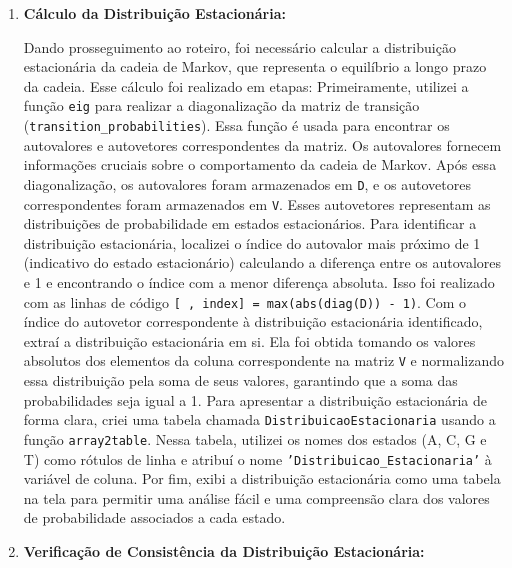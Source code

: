 \documentclass{article}
\begin{document}
\begin{enumerate}
    \item \textbf{Cálculo da Distribuição Estacionária:}
    
    Dando prosseguimento ao roteiro, foi necessário calcular a distribuição estacionária da cadeia de Markov, que representa o equilíbrio a longo prazo da cadeia. Esse cálculo foi realizado em etapas: Primeiramente, utilizei a função \texttt{eig} para realizar a diagonalização da matriz de transição (\texttt{transition\_probabilities}). Essa função é usada para encontrar os autovalores e autovetores correspondentes da matriz. Os autovalores fornecem informações cruciais sobre o comportamento da cadeia de Markov. Após essa diagonalização, os autovalores foram armazenados em \texttt{D}, e os autovetores correspondentes foram armazenados em \texttt{V}. Esses autovetores representam as distribuições de probabilidade em estados estacionários. Para identificar a distribuição estacionária, localizei o índice do autovalor mais próximo de 1 (indicativo do estado estacionário) calculando a diferença entre os autovalores e 1 e encontrando o índice com a menor diferença absoluta. Isso foi realizado com as linhas de código \texttt{[~, index] = max(abs(diag(D)) - 1)}. Com o índice do autovetor correspondente à distribuição estacionária identificado, extraí a distribuição estacionária em si. Ela foi obtida tomando os valores absolutos dos elementos da coluna correspondente na matriz \texttt{V} e normalizando essa distribuição pela soma de seus valores, garantindo que a soma das probabilidades seja igual a 1. Para apresentar a distribuição estacionária de forma clara, criei uma tabela chamada \texttt{DistribuicaoEstacionaria} usando a função \texttt{array2table}. Nessa tabela, utilizei os nomes dos estados (A, C, G e T) como rótulos de linha e atribuí o nome \texttt{'Distribuicao\_Estacionaria'} à variável de coluna. Por fim, exibi a distribuição estacionária como uma tabela na tela para permitir uma análise fácil e uma compreensão clara dos valores de probabilidade associados a cada estado. 

\item \textbf{Verificação de Consistência da Distribuição Estacionária:} 


\end{enumerate}
\end{document}
